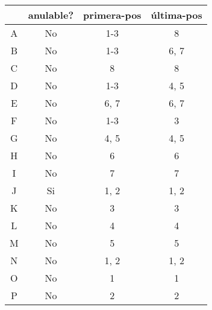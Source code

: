 \documentclass[11pt,a4paper]{report}
\begin{document}
\begin{tabular} {| c | c | c | c |}\hline
 & anulable? & primera-pos & última-pos\\ \hline
A & No & 1-3 & 8\\ \hline
B & No & 1-3 & 6, 7\\ \hline
C & No & 8 & 8\\ \hline
D & No & 1-3 & 4, 5\\ \hline
E & No & 6, 7 & 6, 7\\ \hline
F & No & 1-3 & 3\\ \hline
G & No & 4, 5 & 4, 5\\ \hline
H & No & 6 & 6\\ \hline
I & No & 7 & 7\\ \hline
J & Si & 1, 2 & 1, 2\\ \hline
K & No & 3 & 3\\ \hline
L & No & 4 & 4\\ \hline
M & No & 5 & 5\\ \hline
N & No & 1, 2 & 1, 2\\ \hline
O & No & 1 & 1\\ \hline
P & No & 2 & 2\\ \hline
\end{tabular}
\end{document}
